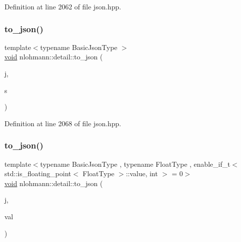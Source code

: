 Definition at line 2062 of file json.\+hpp.

\mbox{\label{namespacenlohmann_1_1detail_a4aa1ca6b7c61bf19d1f30ea5b669f68e}} 
\subsubsection{\texorpdfstring{to\_json()}{to\_json()}\hspace{0.1cm}{\footnotesize\ttfamily [3/17]}}
{\footnotesize\ttfamily template$<$typename Basic\+Json\+Type $>$ \\
\mbox{\hyperlink{namespacenlohmann_1_1detail_a59fca69799f6b9e366710cb9043aa77d}{void}} nlohmann\+::detail\+::to\+\_\+json (\begin{DoxyParamCaption}\item[{Basic\+Json\+Type \&}]{j,  }\item[{typename Basic\+Json\+Type\+::string\+\_\+t \&\&}]{s }\end{DoxyParamCaption})}



Definition at line 2068 of file json.\+hpp.

\mbox{\label{namespacenlohmann_1_1detail_a22bffdc8bc7e43af380ba2050696b230}} 
\subsubsection{\texorpdfstring{to\_json()}{to\_json()}\hspace{0.1cm}{\footnotesize\ttfamily [4/17]}}
{\footnotesize\ttfamily template$<$typename Basic\+Json\+Type , typename Float\+Type , enable\+\_\+if\+\_\+t$<$ std\+::is\+\_\+floating\+\_\+point$<$ Float\+Type $>$\+::value, int $>$  = 0$>$ \\
\mbox{\hyperlink{namespacenlohmann_1_1detail_a59fca69799f6b9e366710cb9043aa77d}{void}} nlohmann\+::detail\+::to\+\_\+json (\begin{DoxyParamCaption}\item[{Basic\+Json\+Type \&}]{j,  }\item[{Float\+Type}]{val }\end{DoxyParamCaption})\hspace{0.3cm}{\ttfamily [noexcept]}}



